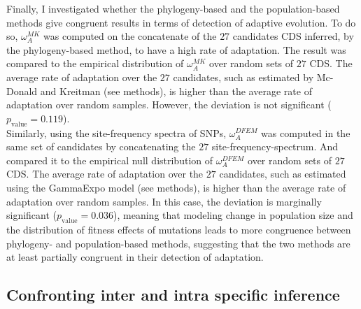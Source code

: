 Finally, I investigated whether the phylogeny-based and the population-based methods give congruent results in terms of detection of adaptive evolution. 
To do so, $\omega_A^{MK}$ was computed on the concatenate of the $27$ candidates CDS inferred, by the phylogeny-based method, to have a high rate of adaptation. The result was compared to the empirical distribution of $\omega_A^{MK}$ over random sets of $27$ CDS.
The average rate of adaptation over the $27$ candidates, such as estimated by Mc-Donald and Kreitman (see methods), is higher than the average rate of adaptation over random samples. However, the deviation is not significant ($p_{\mathrm{value}}=0.119$).\\

Similarly, using the site-frequency spectra of SNPs, $\omega_A^{DFEM}$ was computed in the same set of candidates by concatenating the $27$ site-frequency-spectrum. And compared it to the empirical null distribution of $\omega_A^{DFEM}$ over random sets of $27$ CDS.
The average rate of adaptation over the $27$ candidates, such as estimated using the GammaExpo model (see methods), is higher than the average rate of adaptation over random samples. In this case, the deviation is marginally significant ($p_{\mathrm{value}}=0.036$), 
meaning that modeling change in population size and the distribution of fitness effects of mutations leads to more congruence between phylogeny- and population-based methods, suggesting that the two methods are at least partially congruent in their detection of adaptation.

\subsection{Confronting inter and intra specific inference}


